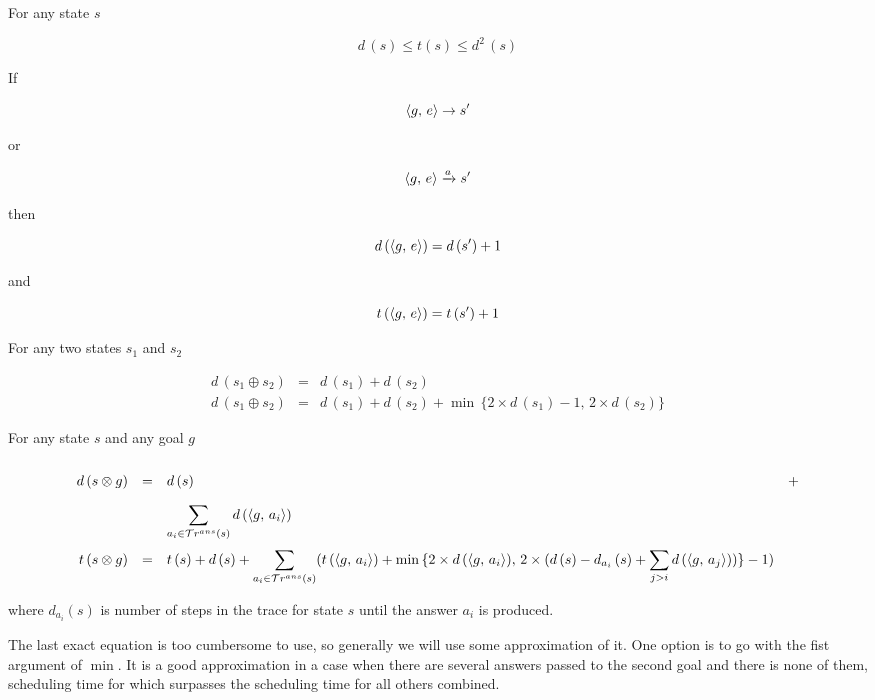 \begin{lemma}
  For any state $s$

  \[
  d\,(s) \le t(s) \le d^2\,(s)
  \]
  
\end{lemma}

\begin{lemma}
  If

  \[\langle g ,\, e \rangle \rightarrow s^\prime\]

  or

  \[\langle g ,\, e \rangle \xrightarrow{a} s^\prime\]

  then

  \[d\,(\langle g ,\, e \rangle) = d\,(s^\prime) + 1\]

  and

  \[t\,(\langle g ,\, e \rangle) = t\,(s^\prime) + 1\]
\end{lemma}

\begin{lemma}
For any two states $s_1$ and $s_2$

\[
\begin{array}{rcl}
  d\,(s_1 \oplus s_2) &=& d\,(s_1) + d\,(s_2) \\
  d\,(s_1 \oplus s_2) &=& d\,(s_1) + d\,(s_2) + \min\,\{2\times d\,(s_1) - 1,\, 2\times d\,(s_2)\} 
\end{array}
\]

\end{lemma}

\begin{lemma}
For any state $s$ and any goal $g$

\[
\renewcommand{\arraystretch}{2}
\begin{array}{rclc}
  d\,(s \otimes g) &=& d\,(s)                                                      & + \\
                   & & \displaystyle\sum\limits_{a_i \in \tra{s}} d\,(\taskst{g}{a_i}) & \\
t\,(s \otimes g) &=& t\,(s) + d\,(s) + \displaystyle\sum\limits_{a_i \in \tra{s}} (t\,(\taskst{g}{a_i}) + \min\,\{2\times d\,(\taskst{g}{a_i}),\,2\times (d\,(s) - d_{a_i}\,(s) + \displaystyle\sum\limits_{j > i} d\,(\taskst{g}{a_j}))\} - 1) &
\end{array}
\]

where $d_{a_i}(s)$ is number of steps in the trace for state $s$ until the answer $a_i$ is produced.
\end{lemma}

The last exact equation is too cumbersome to use, so generally we will use some approximation of it. One option is to go with the fist argument of $\min$. It is a good approximation in a case when there are several answers passed to the second goal and there is none of them, scheduling time for which surpasses the scheduling time for all others combined.

